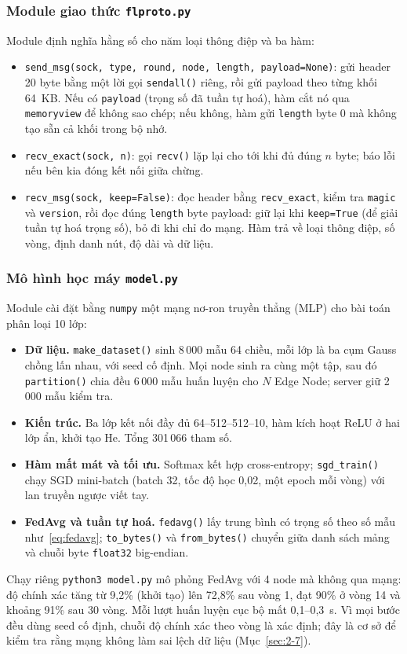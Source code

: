 \subsubsection{Module giao thức \texttt{flproto.py}}
Module định nghĩa hằng số cho năm loại thông điệp và ba hàm:
\begin{itemize}
    \item \texttt{send\_msg(sock, type, round, node, length, payload=None)}: gửi header 20 byte bằng một lời gọi \texttt{sendall()} riêng, rồi gửi payload theo từng khối 64~KB. Nếu có \texttt{payload} (trọng số đã tuần tự hoá), hàm cắt nó qua \texttt{memoryview} để không sao chép; nếu không, hàm gửi \texttt{length} byte 0 mà không tạo sẵn cả khối trong bộ nhớ.
    \item \texttt{recv\_exact(sock, n)}: gọi \texttt{recv()} lặp lại cho tới khi đủ đúng $n$ byte; báo lỗi nếu bên kia đóng kết nối giữa chừng.
    \item \texttt{recv\_msg(sock, keep=False)}: đọc header bằng \texttt{recv\_exact}, kiểm tra \texttt{magic} và \texttt{version}, rồi đọc đúng \texttt{length} byte payload: giữ lại khi \texttt{keep=True} (để giải tuần tự hoá trọng số), bỏ đi khi chỉ đo mạng. Hàm trả về loại thông điệp, số vòng, định danh nút, độ dài và dữ liệu.
\end{itemize}

\subsubsection{Mô hình học máy \texttt{model.py}}
Module cài đặt bằng \texttt{numpy} một mạng nơ-ron truyền thẳng (MLP) cho bài toán phân loại 10 lớp:
\begin{itemize}
    \item \textbf{Dữ liệu.} \texttt{make\_dataset()} sinh 8\,000 mẫu 64 chiều, mỗi lớp là ba cụm Gauss chồng lấn nhau, với seed cố định. Mọi node sinh ra cùng một tập, sau đó \texttt{partition()} chia đều 6\,000 mẫu huấn luyện cho $N$ Edge Node; server giữ 2\,000 mẫu kiểm tra.
    \item \textbf{Kiến trúc.} Ba lớp kết nối đầy đủ 64--512--512--10, hàm kích hoạt ReLU ở hai lớp ẩn, khởi tạo He. Tổng 301\,066 tham số.
    \item \textbf{Hàm mất mát và tối ưu.} Softmax kết hợp cross-entropy; \texttt{sgd\_train()} chạy SGD mini-batch (batch 32, tốc độ học 0{,}02, một epoch mỗi vòng) với lan truyền ngược viết tay.
    \item \textbf{FedAvg và tuần tự hoá.} \texttt{fedavg()} lấy trung bình có trọng số theo số mẫu như~\eqref{eq:fedavg}; \texttt{to\_bytes()} và \texttt{from\_bytes()} chuyển giữa danh sách mảng và chuỗi byte \texttt{float32} big-endian.
\end{itemize}
Chạy riêng \texttt{python3 model.py} mô phỏng FedAvg với 4 node mà không qua mạng: độ chính xác tăng từ 9{,}2\% (khởi tạo) lên 72{,}8\% sau vòng 1, đạt 90\% ở vòng 14 và khoảng 91\% sau 30 vòng. Mỗi lượt huấn luyện cục bộ mất 0{,}1--0{,}3~s. Vì mọi bước đều dùng seed cố định, chuỗi độ chính xác theo vòng là xác định; đây là cơ sở để kiểm tra rằng mạng không làm sai lệch dữ liệu (Mục~\ref{sec:2-7}).

